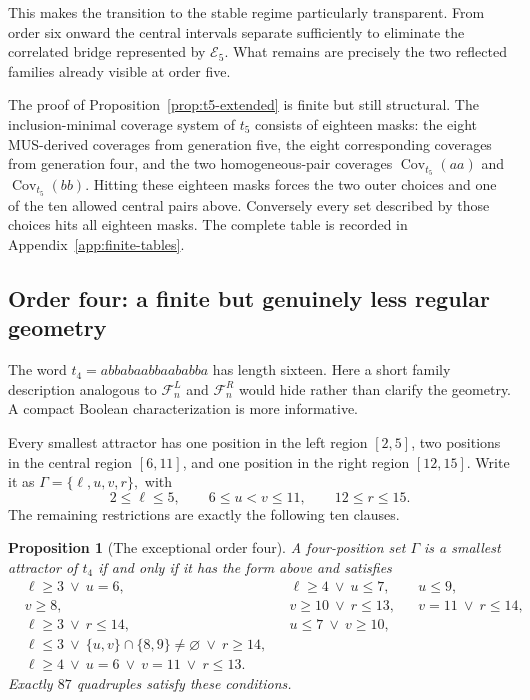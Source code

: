 \documentclass[11pt,a4paper]{article}
\newtheorem{proposition}[theorem]{Proposition}
\theoremstyle{definition}\newtheorem{definition}[theorem]{Definition}
\theoremstyle{remark}\newtheorem{remark}[theorem]{Remark}
\newcommand{\Cov}{\operatorname{Cov}}
\newcommand{\FL}{\mathcal{F}^{L}}
\newcommand{\FR}{\mathcal{F}^{R}}
\begin{document}
This makes the transition to the stable regime particularly transparent.  From order six onward the central intervals separate sufficiently to eliminate the correlated bridge represented by $\mathcal E_5$.  What remains are precisely the two reflected families already visible at order five.

The proof of Proposition~\ref{prop:t5-extended} is finite but still structural.  The inclusion-minimal coverage system of $t_5$ consists of eighteen masks: the eight MUS-derived coverages from generation five, the eight corresponding coverages from generation four, and the two homogeneous-pair coverages $\Cov_{t_5}(aa)$ and $\Cov_{t_5}(bb)$.  Hitting these eighteen masks forces the two outer choices and one of the ten allowed central pairs above.  Conversely every set described by those choices hits all eighteen masks.  The complete table is recorded in Appendix~\ref{app:finite-tables}.

\subsection{Order four: a finite but genuinely less regular geometry}
\label{subsec:t4-exceptional}

The word
$
 t_4=abbabaabbaababba
$
has length sixteen.  Here a short family description analogous to $\FL_n$ and $\FR_n$ would hide rather than clarify the geometry.  A compact Boolean characterization is more informative.

Every smallest attractor has one position in the left region $[2,5]$, two positions in the central region $[6,11]$, and one position in the right region $[12,15]$.  Write it as
$
 \Gamma=\{\ell,u,v,r\},
$
with
\[
 2\le\ell\le5,
 \qquad
 6\le u<v\le11,
 \qquad
 12\le r\le15.
\]
The remaining restrictions are exactly the following ten clauses.

\begin{proposition}[The exceptional order four]
\label{prop:t4-extended}
A four-position set $\Gamma$ is a smallest attractor of $t_4$ if and only if it has the form above and satisfies
\begin{align*}
 &\ell\ge3\ \lor\ u=6,
 &&\ell\ge4\ \lor\ u\le7,
 &&u\le9,\\
 &v\ge8,
 &&v\ge10\ \lor\ r\le13,
 &&v=11\ \lor\ r\le14,\\
 &\ell\ge3\ \lor\ r\le14,
 &&u\le7\ \lor\ v\ge10,\\
 &\ell\le3\ \lor\ \{u,v\}\cap\{8,9\}\ne\varnothing\ \lor\ r\ge14,\\
 &\ell\ge4\ \lor\ u=6\ \lor\ v=11\ \lor\ r\le13.
\end{align*}
Exactly $87$ quadruples satisfy these conditions.
\end{proposition}
\end{document}
